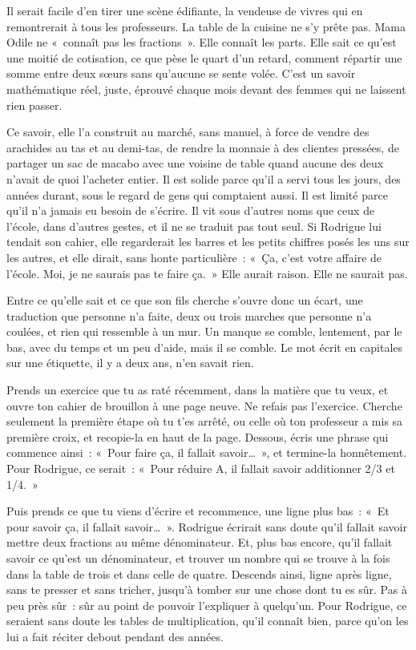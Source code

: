 \documentclass[10.5pt,twoside,openright]{book}
\newcommand{\soustitre}[1]{\par\vspace{1.1em}\noindent{\bfseries\color{accent}#1}\par\vspace{0.4em}\noindent}
\begin{document}
Il serait facile d’en tirer une scène édifiante, la vendeuse de vivres qui en remontrerait à tous les professeurs. La table de la cuisine ne s’y prête pas. Mama Odile ne « connaît pas les fractions ». Elle connaît les parts. Elle sait ce qu’est une moitié de cotisation, ce que pèse le quart d’un retard, comment répartir une somme entre deux sœurs sans qu’aucune se sente volée. C’est un savoir mathématique réel, juste, éprouvé chaque mois devant des femmes qui ne laissent rien passer.

Ce savoir, elle l’a construit au marché, sans manuel, à force de vendre des arachides au tas et au demi-tas, de rendre la monnaie à des clientes pressées, de partager un sac de macabo avec une voisine de table quand aucune des deux n’avait de quoi l’acheter entier. Il est solide parce qu’il a servi tous les jours, des années durant, sous le regard de gens qui comptaient aussi. Il est limité parce qu’il n’a jamais eu besoin de s’écrire. Il vit sous d’autres noms que ceux de l’école, dans d’autres gestes, et il ne se traduit pas tout seul. Si Rodrigue lui tendait son cahier, elle regarderait les barres et les petits chiffres posés les uns sur les autres, et elle dirait, sans honte particulière : « Ça, c’est votre affaire de l’école. Moi, je ne saurais pas te faire ça. » Elle aurait raison. Elle ne saurait pas.

Entre ce qu’elle sait et ce que son fils cherche s’ouvre donc un écart, une traduction que personne n’a faite, deux ou trois marches que personne n’a coulées, et rien qui ressemble à un mur. Un manque se comble, lentement, par le bas, avec du temps et un peu d’aide, mais il se comble. Le mot écrit en capitales sur une étiquette, il y a deux ans, n’en savait rien.

\soustitre{Ce soir, essaie ceci}

Prends un exercice que tu as raté récemment, dans la matière que tu veux, et ouvre ton cahier de brouillon à une page neuve. Ne refais pas l’exercice. Cherche seulement la première étape où tu t’es arrêté, ou celle où ton professeur a mis sa première croix, et recopie-la en haut de la page. Dessous, écris une phrase qui commence ainsi : « Pour faire ça, il fallait savoir… », et termine-la honnêtement. Pour Rodrigue, ce serait : « Pour réduire A, il fallait savoir additionner 2/3 et 1/4. »

Puis prends ce que tu viens d’écrire et recommence, une ligne plus bas : « Et pour savoir ça, il fallait savoir… ». Rodrigue écrirait sans doute qu’il fallait savoir mettre deux fractions au même dénominateur. Et, plus bas encore, qu’il fallait savoir ce qu’est un dénominateur, et trouver un nombre qui se trouve à la fois dans la table de trois et dans celle de quatre. Descends ainsi, ligne après ligne, sans te presser et sans tricher, jusqu’à tomber sur une chose dont tu es sûr. Pas à peu près sûr : sûr au point de pouvoir l’expliquer à quelqu’un. Pour Rodrigue, ce seraient sans doute les tables de multiplication, qu’il connaît bien, parce qu’on les lui a fait réciter debout pendant des années.
\end{document}
